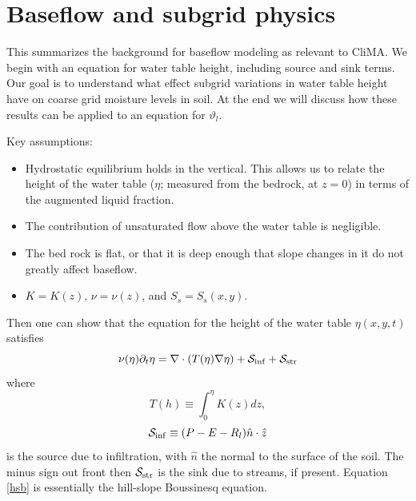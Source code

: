 \documentclass[twoside,10pt]{report}
\begin{document}
\section{Baseflow and subgrid physics}\label{Appendix:WaterTableSubGrid}
This summarizes the background for baseflow modeling as relevant to CliMA. We begin with an equation for water table height, including source and sink terms. Our goal is to understand what effect subgrid variations in water table height have on coarse grid moisture levels in soil. At the end we will discuss how these results can be applied to an equation for $\vartheta_l$.

Key assumptions:
\begin{itemize}
    \item Hydrostatic equilibrium holds in the vertical. This allows us to relate the height of the water table ($\eta$; measured from the bedrock, at $z=0$) in terms of the augmented liquid fraction.
    \item The contribution of unsaturated flow above the water table is negligible.
    \item The bed rock is flat, or that it is deep enough that slope changes in it do not greatly affect baseflow.
    \item $K = K(z)$, $\nu = \nu(z)$, and $S_s = S_s(x, y)$.
\end{itemize}

Then one can show that the equation for the height of the water table $\eta(x,y,t)$ satisfies
\begin{equation}\label{hsb}
    \nu(\eta) \partial_t \eta = \nabla \cdot ( T(\eta) \nabla \eta) + \mathcal{S_{\rm inf}} +\mathcal{S}_{\rm str}
\end{equation}
where
\begin{equation}
    T(h) \equiv \int_0^\eta K(z) dz,
\end{equation}
\begin{equation}
    \mathcal{S_{\rm inf}} \equiv (P-E-R_l) \hat{n} \cdot \hat{z}
\end{equation}
is the source due to infiltration, with $\hat{n}$ the normal to the surface of the soil.  The minus sign out front then $\mathcal{S_{\rm str}}$ is the sink due to streams, if present. Equation \eqref{hsb} is essentially the hill-slope Boussinesq equation.
\end{document}
